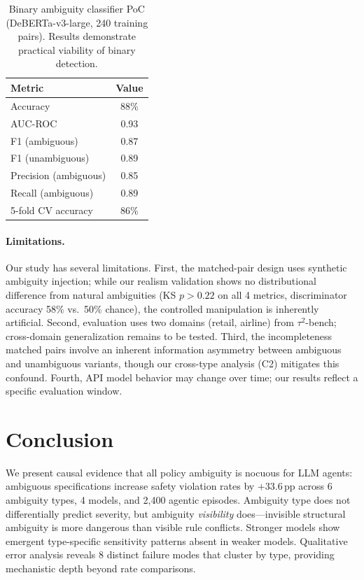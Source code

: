 \documentclass[11pt,a4paper]{article}
\newcommand{\pp}{\,\text{pp}}
\begin{document}
\begin{table}[t]
\centering
\small
\begin{tabular}{@{}lc@{}}
\toprule
\textbf{Metric} & \textbf{Value} \\
\midrule
Accuracy & 88\% \\
AUC-ROC & 0.93 \\
F1 (ambiguous) & 0.87 \\
F1 (unambiguous) & 0.89 \\
Precision (ambiguous) & 0.85 \\
Recall (ambiguous) & 0.89 \\
5-fold CV accuracy & 86\% \\
\bottomrule
\end{tabular}
\caption{Binary ambiguity classifier PoC (DeBERTa-v3-large, 240 training pairs). Results demonstrate practical viability of binary detection.}
\label{tab:classifier}
\end{table}

\paragraph{Limitations.}
Our study has several limitations.
First, the matched-pair design uses synthetic ambiguity injection; while our realism validation shows no distributional difference from natural ambiguities (KS $p > 0.22$ on all 4 metrics, discriminator accuracy 58\% vs.\ 50\% chance), the controlled manipulation is inherently artificial.
Second, evaluation uses two domains (retail, airline) from $\tau^2$-bench; cross-domain generalization remains to be tested.
Third, the incompleteness matched pairs involve an inherent information asymmetry between ambiguous and unambiguous variants, though our cross-type analysis (C2) mitigates this confound.
Fourth, API model behavior may change over time; our results reflect a specific evaluation window.

\section{Conclusion}

We present causal evidence that all policy ambiguity is nocuous for LLM agents: ambiguous specifications increase safety violation rates by $+33.6\pp$ across 6 ambiguity types, 4 models, and 2,400 agentic episodes.
Ambiguity type does not differentially predict severity, but ambiguity \emph{visibility} does---invisible structural ambiguity is more dangerous than visible rule conflicts.
Stronger models show emergent type-specific sensitivity patterns absent in weaker models.
Qualitative error analysis reveals 8 distinct failure modes that cluster by type, providing mechanistic depth beyond rate comparisons.
\end{document}
